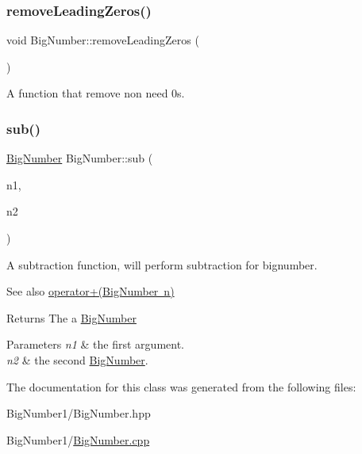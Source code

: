 \subsubsection{\texorpdfstring{removeLeadingZeros()}{removeLeadingZeros()}}
{\footnotesize\ttfamily void Big\+Number\+::remove\+Leading\+Zeros (\begin{DoxyParamCaption}{ }\end{DoxyParamCaption})}



A function that remove non need 0s. 

\mbox{\label{class_big_number_afb6b6f88fdefa42d883baa1f3feb45ca}} 
\subsubsection{\texorpdfstring{sub()}{sub()}}
{\footnotesize\ttfamily \mbox{\hyperlink{class_big_number}{Big\+Number}} Big\+Number\+::sub (\begin{DoxyParamCaption}\item[{\mbox{\hyperlink{class_big_number}{Big\+Number}}}]{n1,  }\item[{\mbox{\hyperlink{class_big_number}{Big\+Number}}}]{n2 }\end{DoxyParamCaption})}



A subtraction function, will perform subtraction for bignumber. 

\begin{DoxySeeAlso}{See also}
\mbox{\hyperlink{class_big_number_a3e43ae5ac8d42ee6f5056635e3935c57}{operator+(\+Big\+Number n)}} 
\end{DoxySeeAlso}
\begin{DoxyReturn}{Returns}
The a \mbox{\hyperlink{class_big_number}{Big\+Number}} 
\end{DoxyReturn}

\begin{DoxyParams}{Parameters}
{\em n1} & the first argument. \\
\hline
{\em n2} & the second \mbox{\hyperlink{class_big_number}{Big\+Number}}. \\
\hline
\end{DoxyParams}


The documentation for this class was generated from the following files\+:\begin{DoxyCompactItemize}
\item 
Big\+Number1/Big\+Number.\+hpp\item 
Big\+Number1/\mbox{\hyperlink{_big_number_8cpp}{Big\+Number.\+cpp}}\end{DoxyCompactItemize}
